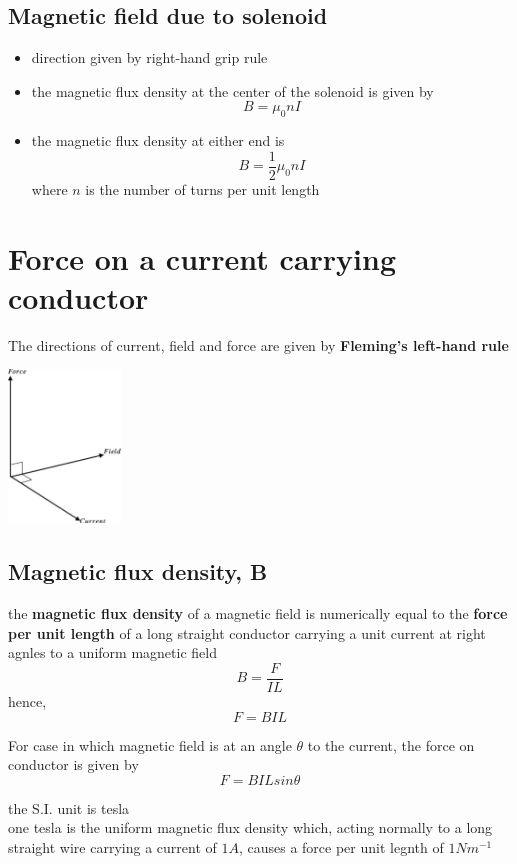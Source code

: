 \documentclass[a4paper, 10pt]{article}
\begin{document}
\subsection{Magnetic field due to solenoid}

\begin{itemize}
   \item direction given by right-hand grip rule
   \item the magnetic flux density at the center of the solenoid is given by
      \[
      B = \mu_0 n I 
      \]
   \item the magnetic flux density at either end is
      \[
      B = \frac{1}{2} \mu_0 n I
      \]
   where $n$ is the number of turns per unit length
      
\end{itemize}	


\section{Force on a current carrying conductor}
\begin{framed}
The directions of current, field and force are given by \textbf{Fleming's left-hand rule}
\begin{center}
   \includegraphics[width=3cm]{figures/2.pdf} 
\end{center}	
\end{framed}	

\subsection{Magnetic flux density, B}
\begin{framed}
   the \textbf{magnetic flux density} of a magnetic field is numerically equal to the \textbf{force per unit length} of a long straight conductor carrying a unit current at right agnles to a uniform magnetic field
   \[
   B = \frac{F}{IL}
   \]
   hence,
   \[
   F = BIL
   \]
   

   For case in which magnetic field is at an angle $\theta$ to the current, the force on conductor is given by
   \[
   F = BIL sin \theta
   \]
   

   the S.I. unit is tesla \\
   one tesla is the uniform magnetic flux density which, acting normally to a long straight wire carrying a current of $1A$, causes a force per unit legnth of $1Nm^{-1}$ 
\end{framed}	
\end{document}
